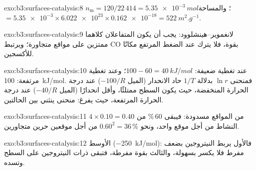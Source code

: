 \begin{solution}{exo:b3:surfaces-catalysis:8}
$n_{\mathrm m} = 120/22\,414 = \qty{5.35e-3}{mol}$؛ والمساحة $= \num{5.35e-3} \times \num{6.022e23} \times \num{0.162e-18} =
\qty{522}{m^2.g^{-1}}$.
\end{solution}

\begin{solution}{exo:b3:surfaces-catalysis:9}
لانغموير--هينشلوود: يجب أن يكون المتفاعلان كلاهما ممتزين على مواقع متجاورة؛
ويرتبط CO بقوة، فلا يترك عند الضغط المرتفع مكانًا للأكسجين.
\end{solution}

\begin{solution}{exo:b3:surfaces-catalysis:10}
عند تغطية ضعيفة: $100 - 60 = \qty{40}{kJ/mol}$؛ وعند تغطية مرتفعة: \qty{100}{kJ/mol}. فمنحنى $\ln r$
بدلالة $1/T$ حاد الانحدار (الميل $-100/R$) عند درجة الحرارة المنخفضة، حيث يكون السطح
ممتلئًا، وأقل انحدارًا (الميل $-40/R$) عند درجة الحرارة المرتفعة، حيث يفرغ: منحنى
ينثني بين الحالتين.
\end{solution}

\begin{solution}{exo:b3:surfaces-catalysis:11}
$4 \times 0.10 = 0.40$ من المواقع مسدودة: فيبقى 60\,\% من النشاط من أجل موقع
واحد، ونحو $0.60^2 = 36\,\%$ من أجل موقعين حرين متجاورين.
\end{solution}

\begin{solution}{exo:b3:surfaces-catalysis:12}
الأوسط (\qty{-250}{kJ/mol}): فالأول يربط النيتروجين بضعف مفرط فلا يكسر 
بسهولة، والثالث بقوة مفرطة، فتبقى ذرات النيتروجين على السطح
وتسده.
\end{solution}

